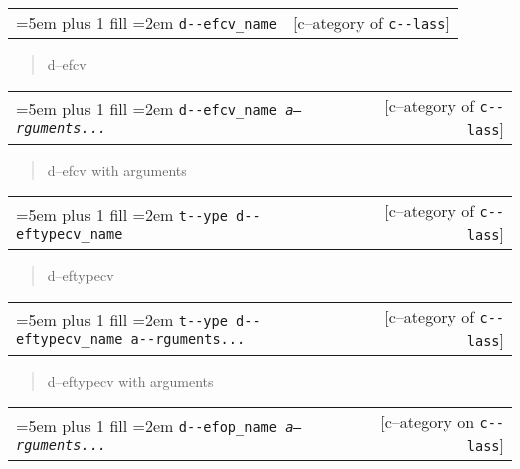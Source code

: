 \documentclass{book}
\begin{document}
\noindent\begin{tabularx}{\linewidth}{@{}Xr}
\rightskip=5em plus 1 fill
\hangindent=2em
\texttt{d{-}{-}efcv\_name}& [c--ategory of \texttt{c{-}{-}lass}]
\end{tabularx}

%
\begin{quote}
\unskip{\parskip=0pt\noindent}%
d--efcv
\end{quote}


\noindent\begin{tabularx}{\linewidth}{@{}Xr}
\rightskip=5em plus 1 fill
\hangindent=2em
\texttt{d{-}{-}efcv\_name \EmbracOn{}\textnormal{\textsl{a--rguments...}}\EmbracOff{}}& [c--ategory of \texttt{c{-}{-}lass}]
\end{tabularx}

%
\begin{quote}
\unskip{\parskip=0pt\noindent}%
d--efcv with arguments
\end{quote}


\noindent\begin{tabularx}{\linewidth}{@{}Xr}
\rightskip=5em plus 1 fill
\hangindent=2em
\texttt{t{-}{-}ype d{-}{-}eftypecv\_name}& [c--ategory of \texttt{c{-}{-}lass}]
\end{tabularx}

%
\begin{quote}
\unskip{\parskip=0pt\noindent}%
d--eftypecv
\end{quote}


\noindent\begin{tabularx}{\linewidth}{@{}Xr}
\rightskip=5em plus 1 fill
\hangindent=2em
\texttt{t{-}{-}ype d{-}{-}eftypecv\_name a{-}{-}rguments...}& [c--ategory of \texttt{c{-}{-}lass}]
\end{tabularx}

%
\begin{quote}
\unskip{\parskip=0pt\noindent}%
d--eftypecv with arguments
\end{quote}


\noindent\begin{tabularx}{\linewidth}{@{}Xr}
\rightskip=5em plus 1 fill
\hangindent=2em
\texttt{d{-}{-}efop\_name \EmbracOn{}\textnormal{\textsl{a--rguments...}}\EmbracOff{}}& [c--ategory on \texttt{c{-}{-}lass}]
\end{tabularx}
\end{document}
